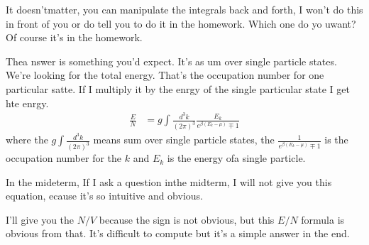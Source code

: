 It doesn'tmatter,
you can manipulate the integrals back and forth,
I won't do this in front of you or do tell you to do it in the homework.
Which one do yo uwant?
Of course it's in the homework.

Thea nswer is something you'd expect.
It's as um over single particle states.
We're looking for the total energy.
That's the occupation number for one particular satte.
If I multiply it by the enrgy of the single particular state I get hte enrgy.
\begin{align}
    \frac{E}{N} &=
    g \int \frac{d^3k}{(2\pi)^3}
    \frac{E_k}{e^{\beta\left( E_k - \mu \right)} \mp 1}
\end{align}
where the  $g \int \frac{d^3k}{(2\pi)^3}$ means sum over single particle states,
the $\frac{1}{e^{\beta\left( E_k - \mu \right)} \mp 1}$ is the occupation number
for the $k$ and $E_k$ is the energy ofa single particle.

In the mideterm,
If I ask a question inthe midterm,
I will not give you this equation,
ecause it's so intuitive and obvious.

I'll give you the $N/V$ because the sign is not obvious,
but this $E/N$ formula is obvious from that.
It's difficult to compute but it's a simple answer in the end.
